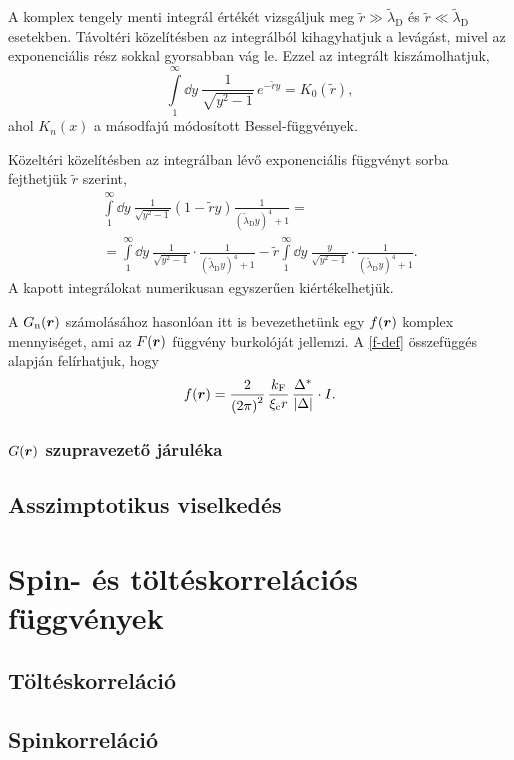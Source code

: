 \documentclass[a4paper,12pt,titlepage]{article}
\newcommand{\RR}{{\vb*{r}}}
\begin{document}
A komplex tengely menti integrál értékét vizsgáljuk meg $\tilde{r} \gg \tilde{\lambda}_\text{D}$ és $\tilde{r} \ll \tilde{\lambda}_\text{D}$ esetekben.  Távoltéri közelítésben az integrálból kihagyhatjuk a levágást, mivel az exponenciális rész sokkal gyorsabban vág le.  Ezzel az integrált kiszámolhatjuk,
\begin{equation}
	\int\limits_1^\infty \dd{y} ~ \frac{1}{\sqrt{y^2 - 1}} \, e^{-\tilde{r} y} = K_0(\tilde{r}),
\end{equation}
ahol $K_n(x)$ a másodfajú módosított Bessel-függvények.

Közeltéri közelítésben az integrálban lévő exponenciális függvényt sorba fejthetjük $\tilde{r}$ szerint,
\begin{multline}
	\int\limits_1^\infty \dd{y} ~ \frac{1}{\sqrt{y^2 - 1}} \left( 1 - \tilde{r} y \right) \frac{1}{\left( \tilde{\lambda}_\text{D} y \right)^4 + 1} = \\
	= \int\limits_1^\infty \dd{y} ~ \frac{1}{\sqrt{y^2 - 1}} \cdot \frac{1}{\left( \tilde{\lambda}_\text{D} y \right)^4 + 1} - \tilde{r} \int\limits_1^\infty \dd{y} ~ \frac{y}{\sqrt{y^2 - 1}} \cdot \frac{1}{\left( \tilde{\lambda}_\text{D} y \right)^4 + 1}.
\end{multline}
A kapott integrálokat numerikusan egyszerűen kiértékelhetjük.

A $G_\text{n}(\RR)$ számolásához hasonlóan itt is bevezethetünk egy $f(\RR)$ komplex mennyiséget, ami az $F(\RR)$ függvény burkolóját jellemzi.  A \eqref{f-def} összefüggés alapján felírhatjuk, hogy
\begin{equation}
	f(\RR) = \frac{2}{\left( 2 \pi \right)^2} \, \frac{k_\text{F}}{\xi_\text{c} r} \, \frac{\Delta^*}{\left| \Delta \right|} \cdot I.
\end{equation}


\subsubsection{$G(\RR)$ szupravezető járuléka}

\subsection{Asszimptotikus viselkedés}



\section{Spin- és töltéskorrelációs függvények}

\subsection{Töltéskorreláció}
\subsection{Spinkorreláció}




\begin{thebibliography}{}
\end{thebibliography}
\end{document}
